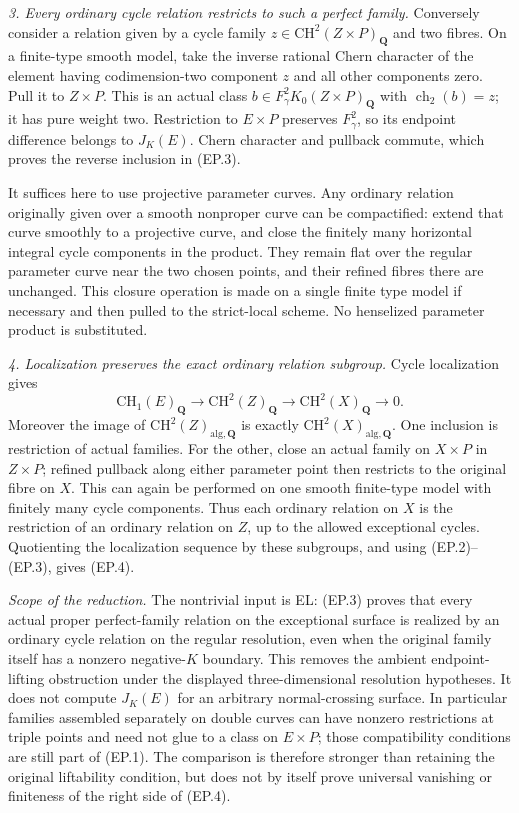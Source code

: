 \emph{3. Every ordinary cycle relation restricts to such a perfect family.}
Conversely consider a relation given by a cycle family
$z\in\mathrm{CH}^2(Z\times P)_{\mathbf Q}$ and two fibres.
On a finite-type smooth model, take the inverse rational Chern
character of the element having codimension-two component $z$
and all other components zero.  Pull it to $Z\times P$.
This is an actual class
$b\in F_\gamma^2K_0(Z\times P)_{\mathbf Q}$ with
$\operatorname{ch}_2(b)=z$; it has pure weight two.
Restriction to $E\times P$ preserves $F_\gamma^2$, so its
endpoint difference belongs to $J_K(E)$.  Chern character and
pullback commute, which proves the reverse inclusion in (EP.3).

It suffices here to use projective parameter curves.  Any ordinary
relation originally given over a smooth nonproper curve can be
compactified: extend that curve smoothly to a projective curve,
and close the finitely many horizontal integral cycle components
in the product.  They remain flat over the regular parameter
curve near the two chosen points, and their refined fibres there
are unchanged.  This closure operation is made on a single finite
type model if necessary and then pulled to the strict-local
scheme.  No henselized parameter product is substituted.

\emph{4. Localization preserves the exact ordinary relation subgroup.}
Cycle localization gives
\[
 \mathrm{CH}_1(E)_{\mathbf Q}\longrightarrow
 \mathrm{CH}^2(Z)_{\mathbf Q}\longrightarrow
 \mathrm{CH}^2(X)_{\mathbf Q}\longrightarrow0.
\]
Moreover the image of
$\mathrm{CH}^2(Z)_{\mathrm{alg},\mathbf Q}$ is exactly
$\mathrm{CH}^2(X)_{\mathrm{alg},\mathbf Q}$.
One inclusion is restriction of actual families.  For the other,
close an actual family on $X\times P$ in $Z\times P$; refined
pullback along either parameter point then restricts to the
original fibre on $X$.  This can again be performed on one smooth
finite-type model with finitely many cycle components.  Thus each
ordinary relation on $X$ is the restriction of an ordinary relation
on $Z$, up to the allowed exceptional cycles.  Quotienting the
localization sequence by these subgroups, and using (EP.2)--(EP.3),
gives (EP.4).

\emph{Scope of the reduction.}
The nontrivial input is EL: (EP.3) proves that every actual proper
perfect-family relation on the exceptional surface is realized
by an ordinary cycle relation on the regular resolution, even
when the original family itself has a nonzero negative-$K$
boundary.  This removes the ambient endpoint-lifting obstruction
under the displayed three-dimensional resolution hypotheses.
It does not compute $J_K(E)$ for an arbitrary normal-crossing
surface.  In particular families assembled separately on double
curves can have nonzero restrictions at triple points and need
not glue to a class on $E\times P$; those compatibility conditions
are still part of (EP.1).  The comparison is therefore stronger
than retaining the original liftability condition, but does not
by itself prove universal vanishing or finiteness of the right
side of (EP.4).
